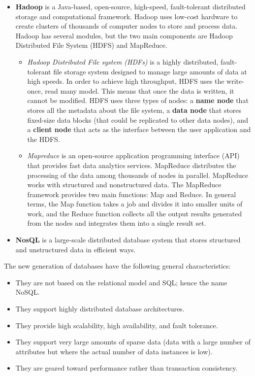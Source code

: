 \documentclass[a4paper, 12pt, titlepage]{report}
\begin{document}
\begin{itemize}
\item \textbf{Hadoop} is a Java-based, open-source, high-speed, fault-tolerant distributed storage and computational framework. Hadoop uses low-cost hardware to create clusters of thousands of computer nodes to store and process data. Hadoop has several modules, but the two main components are Hadoop Distributed File System (HDFS) and MapReduce.
\begin{itemize}
\item \emph{Hadoop Distributed File system (HDFs)} is a highly distributed, fault-tolerant file storage system designed to manage large amounts of data at high speeds. In order to achieve high throughput, HDFS uses the write-once, read many model. This means that once the data is written, it cannot be modified. HDFS uses three types of nodes: a \textbf{name node} that stores all the metadata about the file system, a \textbf{data node} that stores fixed-size data blocks (that could be replicated to other data nodes), and a \textbf{client node} that acts as the interface between the user application and the HDFS.
\item \emph{Mapreduce} is an open-source application programming interface (API) that provides fast data analytics services. MapReduce distributes the processing of the data among thousands of nodes in parallel. MapReduce works with structured and nonstructured data. The MapReduce framework provides two main functions: Map and Reduce. In general terms, the Map function takes a job and divides it into smaller units of work, and the Reduce function collects all the output results generated from the nodes and integrates them into a single result set.
\end{itemize}
\item \textbf{NosQL} is a large-scale distributed database system that stores structured and unstructured data in efficient ways.
\end{itemize}
The new generation of databases have the following general characteristics:
\begin{itemize}
\item They are not based on the relational model and SQL; hence the name NoSQL.
\item They support highly distributed database architectures.
\item They provide high scalability, high availability, and fault tolerance.
\item They support very large amounts of sparse data (data with a large number of attributes but where the actual number of data instances is low).
\item They are geared toward performance rather than transaction consistency.
\end{itemize}
\end{document}
